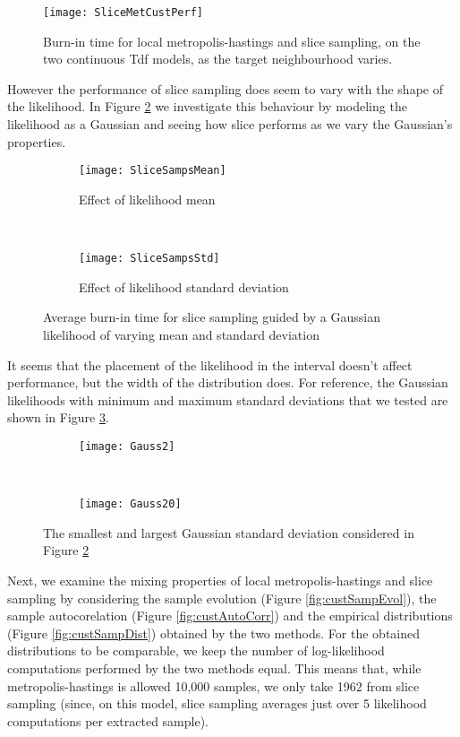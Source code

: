 \begin{figure}[h]
    \centering
    \texttt{[image: SliceMetCustPerf]}
    \caption{Burn-in time for local metropolis-hastings and slice sampling, on the two continuous Tdf models, as the target neighbourhood varies.}
    \label{fig:SliceMetCustPerf}
\end{figure}

However the performance of slice sampling does seem to vary with the shape of the likelihood. In Figure \ref{fig:sliceGaussLik} we investigate this behaviour by modeling the likelihood as a Gaussian and seeing how slice performs as we vary the Gaussian's properties.

\begin{figure}[h]
    \centering
    \begin{subfigure}[t]{0.48\textwidth}
      \texttt{[image: SliceSampsMean]}
      \caption{Effect of likelihood mean}
    \end{subfigure}
    ~
    \begin{subfigure}[t]{0.48\textwidth}
      \texttt{[image: SliceSampsStd]}
      \caption{Effect of likelihood standard deviation}
    \end{subfigure}
    \caption{Average burn-in time for slice sampling guided by a Gaussian likelihood of varying mean and standard deviation}
    \label{fig:sliceGaussLik}
\end{figure}

It seems that the placement of the likelihood in the interval doesn't affect performance, but the width of the distribution does. For reference, the Gaussian likelihoods with minimum and maximum standard deviations that we tested are shown in Figure \ref{fig:gaussStdDev}.

\begin{figure}[h]
    \centering
    \begin{subfigure}[t]{0.48\textwidth}
      \texttt{[image: Gauss2]}
    \end{subfigure}
    ~
    \begin{subfigure}[t]{0.48\textwidth}
      \texttt{[image: Gauss20]}
    \end{subfigure}
    \caption{The smallest and largest Gaussian standard deviation considered in Figure \ref{fig:sliceGaussLik}}
    \label{fig:gaussStdDev}
\end{figure}

Next, we examine the mixing properties of local metropolis-hastings and slice sampling by considering the sample evolution (Figure \ref{fig:custSampEvol}), the sample autocorelation (Figure \ref{fig:custAutoCorr}) and the empirical distributions (Figure \ref{fig:custSampDist}) obtained by the two methods. For the obtained distributions to be comparable, we keep the number of log-likelihood computations performed by the two methods equal. This means that, while metropolis-hastings is allowed 10,000 samples, we only take 1962 from slice sampling (since, on this model, slice sampling averages just over 5 likelihood computations per extracted sample).

